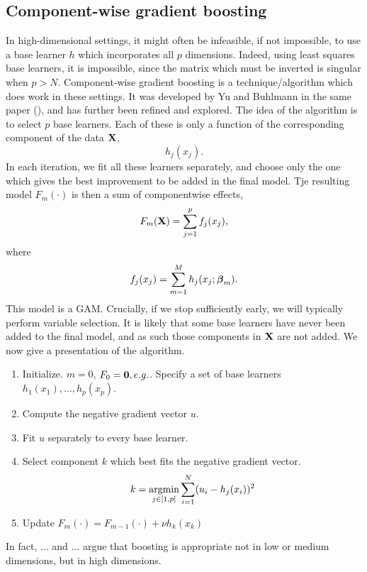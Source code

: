 \subsection{Component-wise gradient boosting}
In high-dimensional settings, it might often be infeasible, if not impossible, to use a base learner $h$ which incorporates all $p$ dimensions. Indeed, using least squares base learners, it is impossible, since the matrix which must be inverted is singular when $p>N$. Component-wise gradient boosting is a technique/algorithm which does work in these settings. It was developed by Yu and Buhlmann in the same paper (\cite{buhlmann-yu}), and has further been refined and explored. The idea of the algorithm is to select $p$ base learners. Each of these is only a function of the corresponding component of the data $\mathbf{X}$,
\begin{equation}
    h_j(x_j).
\end{equation}
In each iteration, we fit all these learners separately, and choose only the one which gives the best improvement to be added in the final model. Tje resulting model $F_m(\cdot)$ is then a sum of componentwise effects,
\begin{equation}
    F_m(\mathbf{X})=\sum_{j=1}^pf_j(x_j),
\end{equation}
where
\begin{equation}
    f_j(x_j)=\sum_{m=1}^Mh_j(x_j;\boldsymbol{\beta}_m).
\end{equation}
This model is a GAM. Crucially, if we stop sufficiently early, we will typically perform variable selection. It is likely that some base learners have never been added to the final model, and as such those components in $\mathbf{X}$ are not added. We now give a presentation of the algorithm.
\begin{enumerate}
    \item Initialize. $m=0$, $F_0=\mathbf{0}, e.g.$. Specify a set of base learners $h_1(x_1),\dotsc,h_p(x_p)$.
    \item Compute the negative gradient vector $u$.
    \item Fit $u$ separately to every base learner.
    \item Select component $k$ which best fits the negative gradient vector.
        \begin{equation}
            k=\operatorname*{argmin}_{j\in[1,p]}\sum_{i=1}^N(u_i-h_j(x_i))^2
        \end{equation}
    \item Update $F_m(\cdot)=F_{m-1}(\cdot)+\nu h_k(x_k)$
\end{enumerate}
In fact, ... and ... argue that boosting is appropriate not in low or medium dimensions, but in high dimensions.